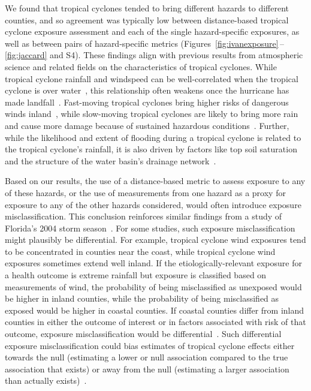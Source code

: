 We found that tropical cyclones tended to bring different hazards to different
counties, and so agreement was typically low between distance-based
tropical cyclone exposure assessment and each of the single hazard-specific
exposures, as well as between pairs of hazard-specific metrics
(Figures~\ref{fig:ivanexposure}\,--\,\ref{fig:jaccard} and S4).  These
findings align with previous results from atmospheric science and related
fields on the characteristics of tropical cyclones. While tropical cyclone
rainfall and windspeed can be well-correlated when the tropical cyclone is over
water~\parencite{cerveny2000}, this relationship often weakens once the
hurricane has made landfall~\parencite{jiang2008}.  Fast-moving tropical
cyclones bring higher risks of dangerous winds inland~\parencite{kruk2010},
while slow-moving tropical cyclones are likely to bring more
rain~\parencite{rappaport2000} and cause more damage because of sustained
hazardous conditions~\parencite{rezapour2014}. Further, while the likelihood
and extent of flooding during a tropical cyclone is related to the tropical
cyclone's rainfall, it is also driven by factors like top soil saturation and
the structure of the water basin's drainage network~\parencite{chen2015,
rees2001}. 

Based on our results, the use of a distance-based metric to assess exposure to any of
these hazards, or the use of measurements from one hazard as a proxy for
exposure to any of the other hazards considered, would often introduce exposure
misclassification. This conclusion reinforces similar findings from a study of
Florida's 2004 storm season~\parencite{grabich2015measuring}.  For some
studies, such exposure misclassification might plausibly be differential.  For
example, tropical cyclone wind exposures tend to be concentrated in counties
near the coast, while tropical cyclone wind exposures sometimes extend well
inland.  If the etiologically-relevant exposure for a health outcome is extreme
rainfall but exposure is classified based on measurements of wind, the
probability of being misclassified as unexposed would be higher in inland
counties, while the probability of being misclassified as exposed would be
higher in coastal counties. If coastal counties differ from inland counties in
either the outcome of interest or in factors associated with risk of that
outcome, exposure misclassification would be
differential~\parencite{savitz2016interpreting}.  Such differential exposure
misclassification could bias estimates of tropical cyclone effects either
towards the null (estimating a lower or null association compared to the true
association that exists) or away from the null (estimating a larger association
than actually exists)~\parencite{savitz2016interpreting, armstrong1998effect}.  

